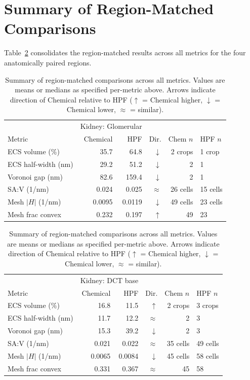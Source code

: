 \documentclass[times, twoside]{zHenriquesLab-StyleBioRxiv}
\begin{document}
\section*{Summary of Region-Matched Comparisons}

Table~\ref{tab:matched_summary} consolidates the region-matched results across all metrics for the four anatomically paired regions.

\begin{table}[t]
\centering
\caption{Summary of region-matched comparisons across all metrics. Values are means or medians as specified per-metric above. Arrows indicate direction of Chemical relative to HPF ($\uparrow$ = Chemical higher, $\downarrow$ = Chemical lower, $\approx$ = similar).}
\label{tab:matched_summary}
\small
\begin{tabular}{lrrrrl}
\toprule
& \multicolumn{2}{c}{Kidney: Glomerular} & & & \\
Metric & Chemical & HPF & Dir. & Chem $n$ & HPF $n$ \\
\midrule
ECS volume (\%) & 35.7 & 64.8 & $\downarrow$ & 2 crops & 1 crop \\
ECS half-width (nm) & 29.2 & 51.2 & $\downarrow$ & 2 & 1 \\
Voronoi gap (nm) & 82.6 & 159.4 & $\downarrow$ & 2 & 1 \\
SA:V (1/nm) & 0.024 & 0.025 & $\approx$ & 26 cells & 15 cells \\
Mesh $|H|$ (1/nm) & 0.0095 & 0.0119 & $\downarrow$ & 49 cells & 23 cells \\
Mesh frac convex & 0.232 & 0.197 & $\uparrow$ & 49 & 23 \\
\bottomrule
\end{tabular}

\vspace{1em}

\begin{tabular}{lrrrrl}
\toprule
& \multicolumn{2}{c}{Kidney: DCT base} & & & \\
Metric & Chemical & HPF & Dir. & Chem $n$ & HPF $n$ \\
\midrule
ECS volume (\%) & 16.8 & 11.5 & $\uparrow$ & 2 crops & 3 crops \\
ECS half-width (nm) & 11.7 & 12.2 & $\approx$ & 2 & 3 \\
Voronoi gap (nm) & 15.3 & 39.2 & $\downarrow$ & 2 & 3 \\
SA:V (1/nm) & 0.021 & 0.022 & $\approx$ & 35 cells & 49 cells \\
Mesh $|H|$ (1/nm) & 0.0065 & 0.0084 & $\downarrow$ & 45 cells & 58 cells \\
Mesh frac convex & 0.331 & 0.367 & $\approx$ & 45 & 58 \\
\bottomrule
\end{tabular}


\end{table}
\end{document}
